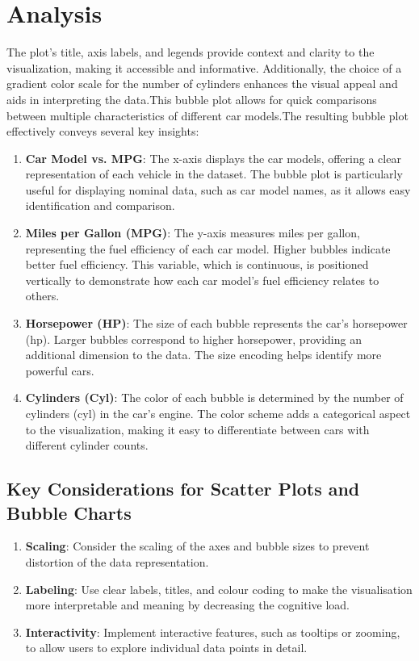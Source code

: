 \documentclass{article}\usepackage[]{graphicx}\usepackage[]{xcolor}
\begin{document}
\section{Analysis}
The plot's title, axis labels, and legends provide context and clarity to the visualization, making it accessible and informative. Additionally, the choice of a gradient color scale for the number of cylinders enhances the visual appeal and aids in interpreting the data.This bubble plot allows for quick comparisons between multiple characteristics of different car models.The resulting bubble plot effectively conveys several key insights:
\begin{enumerate}
\item \textbf{Car Model vs. MPG}: The x-axis displays the car models, offering a clear representation of each vehicle in the dataset. The bubble plot is particularly useful for displaying nominal data, such as car model names, as it allows easy identification and comparison.
\item \textbf{Miles per Gallon (MPG)}: The y-axis measures miles per gallon, representing the fuel efficiency of each car model. Higher bubbles indicate better fuel efficiency. This variable, which is continuous, is positioned vertically to demonstrate how each car model's fuel efficiency relates to others.
\item \textbf{Horsepower (HP)}: The size of each bubble represents the car's horsepower (hp). Larger bubbles correspond to higher horsepower, providing an additional dimension to the data. The size encoding helps identify more powerful cars.
\item \textbf{Cylinders (Cyl)}: The color of each bubble is determined by the number of cylinders (cyl) in the car's engine. The color scheme adds a categorical aspect to the visualization, making it easy to differentiate between cars with different cylinder counts.
\end{enumerate}


\subsection{Key Considerations for Scatter Plots and Bubble Charts}
    \begin{enumerate}
        \item \textbf{Scaling}: Consider the scaling of the axes and bubble sizes to prevent distortion of the data representation.
        \item \textbf{Labeling}: Use clear labels, titles, and colour coding to make the visualisation more interpretable and meaning by decreasing the cognitive load. 
        \item \textbf{Interactivity}: Implement interactive features, such as tooltips or zooming, to allow users to explore individual data points in detail.
    \end{enumerate}
\end{document}
